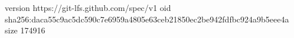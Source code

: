 version https://git-lfs.github.com/spec/v1
oid sha256:daca55c9ac5dc590c7e6959a4805e63ceb21850ec2be942fdfbc924a9b5eee4a
size 174916
